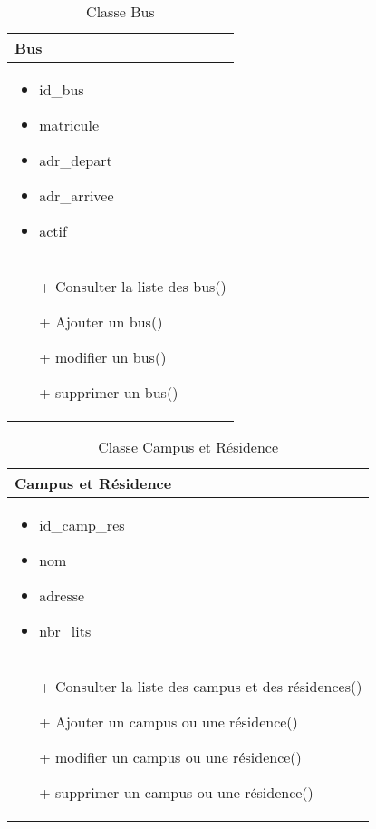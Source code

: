 \begin{table}[H]
    \begin{center}
        \begin{tabular}{|Z{5cm}|}
            \hline
            \textbf{Bus}\\
            \hline
            \begin{itemize}
                \item id\_bus
                \item matricule
                \item adr\_depart
                \item adr\_arrivee
                \item actif
            \end{itemize}\\
            \hline
            \begin{itemize}
                \item[+] Consulter la liste des bus()
                \item[+] Ajouter un bus()
                \item[+] modifier un bus()
                \item[+] supprimer un bus()
            \end{itemize}
            \\
            \hline
        \end{tabular}	
        \caption{Classe Bus}
    \end{center}
\end{table}

\begin{table}[H]
    \begin{center}
        \begin{tabular}{|Z{5cm}|}
            \hline
            \textbf{Campus et Résidence}\\
            \hline
            \begin{itemize}
                \item id\_camp\_res
                \item nom
                \item adresse
                \item nbr\_lits
            \end{itemize}\\
            \hline
            \begin{itemize}
                \item[+] Consulter la liste des campus et des résidences()
                \item[+] Ajouter un campus ou une résidence()
                \item[+] modifier un campus ou une résidence()
                \item[+] supprimer un campus ou une résidence()
            \end{itemize}
            \\
            \hline
        \end{tabular}	
        \caption{Classe Campus et Résidence}
    \end{center}
\end{table}

